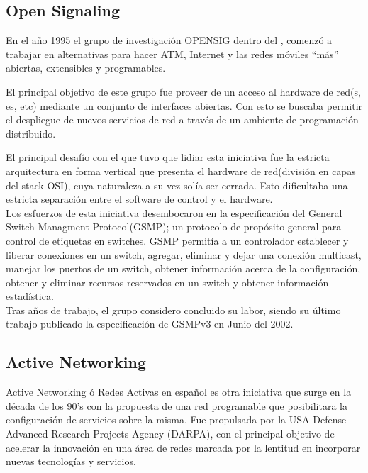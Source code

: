 \subsection{Open Signaling}
En el año 1995 el grupo de investigación OPENSIG\cite{campbell1999open} dentro del , comenzó a trabajar en alternativas para hacer ATM, Internet y las redes móviles ``más'' abiertas, extensibles y programables.

El principal objetivo de este grupo fue proveer de un acceso al hardware de red(s, es, etc) mediante un conjunto de interfaces abiertas. Con esto se buscaba permitir el despliegue de nuevos servicios de red a través de un ambiente de programación distribuido.

El principal desafío con el que tuvo que lidiar esta iniciativa fue la estricta arquitectura en forma vertical que presenta el hardware de red(división en capas del stack OSI), cuya naturaleza a su vez solía ser cerrada. Esto dificultaba una estricta separación entre el software de control y el hardware.\\

Los esfuerzos de esta iniciativa desembocaron en la especificación del General Switch Managment Protocol(GSMP); un protocolo de propósito general para control de etiquetas en switches.
GSMP permitía a un controlador establecer y liberar conexiones en un switch, agregar, eliminar
y dejar una conexión multicast, manejar los puertos de un switch, obtener información acerca de la configuración, obtener y eliminar recursos reservados en un switch y obtener información estadística.\\

Tras años de trabajo, el grupo considero concluido su labor, siendo su último trabajo publicado la especificación de GSMPv3 en Junio del 2002\cite{doria2002general}.

\subsection{Active Networking}
Active Networking\citep{tennenhouse1997survey}\citep{tennenhouse2002towards}\citep{moore2001towards} \'o Redes Activas en español es otra iniciativa que surge en la década de los 90's con la propuesta de una red programable que posibilitara la configuración de servicios sobre la misma. Fue propulsada por la USA Defense Advanced Research Projects Agency (DARPA), con el principal objetivo de acelerar la innovación en una área de redes marcada por la lentitud en incorporar nuevas tecnologías y servicios.\\

